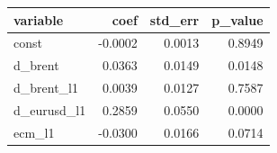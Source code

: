 \begin{tabular}{lrrr}
\toprule
variable & coef & std\_err & p\_value \\
\midrule
const & -0.0002 & 0.0013 & 0.8949 \\
d\_brent & 0.0363 & 0.0149 & 0.0148 \\
d\_brent\_l1 & 0.0039 & 0.0127 & 0.7587 \\
d\_eurusd\_l1 & 0.2859 & 0.0550 & 0.0000 \\
ecm\_l1 & -0.0300 & 0.0166 & 0.0714 \\
\bottomrule
\end{tabular}
